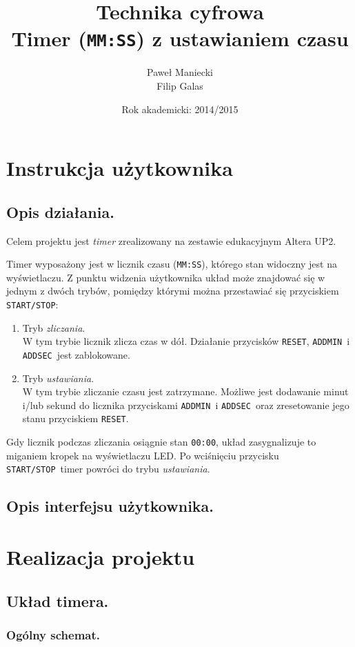 \documentclass[a4paper,oneside]{report}
\title{
	\textbf{Technika cyfrowa}
	\\
	Timer (\texttt{MM:SS}) z ustawianiem czasu
	}
\author{
	Paweł Maniecki\\
	Filip Galas
	}
\date{Rok akademicki: 2014/2015}
\newcommand{\startstop}{\texttt{START/STOP}}
\newcommand{\reset}{\texttt{RESET}}
\newcommand{\addmin}{\texttt{ADD\textunderscore MIN}}
\newcommand{\addsec}{\texttt{ADD\textunderscore SEC}}
\begin{document}
\maketitle

\tableofcontents

\chapter{Instrukcja użytkownika}
\section{Opis działania.}
Celem projektu jest \emph{timer} zrealizowany na zestawie
edukacyjnym Altera UP2.

Timer wyposażony jest w licznik czasu (\texttt{MM:SS}), którego
stan widoczny jest na wyświetlaczu. Z punktu widzenia użytkownika
układ może znajdować się w jednym z dwóch trybów, pomiędzy którymi
można przestawiać się przyciskiem \startstop :
\begin{enumerate}
\item Tryb \emph{zliczania}.\\
W tym trybie licznik zlicza czas w dół. Działanie przycisków
\reset , \addmin\ i \addsec\ jest zablokowane.
\item Tryb \emph{ustawiania}.\\
W tym trybie zliczanie czasu jest zatrzymane. Możliwe jest
dodawanie minut i/lub sekund do licznika przyciskami \addmin\ i
\addsec\ oraz zresetowanie jego stanu przyciskiem \reset .
\end{enumerate}
Gdy licznik podczas zliczania osiągnie stan \texttt{00:00}, układ
zasygnalizuje to miganiem kropek na wyświetlaczu LED. Po
wciśnięciu przycisku \startstop\ timer powróci do trybu
\emph{ustawiania}.
\section{Opis interfejsu użytkownika.}

\chapter{Realizacja projektu}
\section{Układ timera.}
\subsection{Ogólny schemat.}
\end{document}
